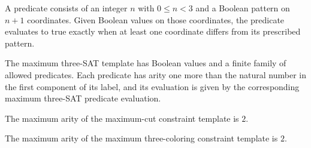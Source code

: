 \begin{definition}
\label{FABL.maxThreeSatPredicateEval}
\leanok
{}
A predicate consists of an integer $n$ with $0\le n<3$ and a Boolean pattern on $n+1$
coordinates. Given Boolean values on those coordinates, the predicate evaluates to true
exactly when at least one coordinate differs from its prescribed pattern.
\end{definition}

\begin{definition}
\label{FABL.maxThreeSatTemplate}
\leanok
{}
The maximum three-SAT template has Boolean values and a finite family of allowed
predicates. Each predicate has arity one more than the natural number in the first
component of its label, and its evaluation is given by the corresponding maximum
three-SAT predicate evaluation.
\end{definition}

\begin{theorem}
\label{FABL.maxArity_maxCutTemplate}
\leanok
{}
The maximum arity of the maximum-cut constraint template is $2$.
\end{theorem}

\begin{theorem}
\label{FABL.maxArity_maxThreeColoringTemplate}
\leanok
{}
The maximum arity of the maximum three-coloring constraint template is $2$.
\end{theorem}

